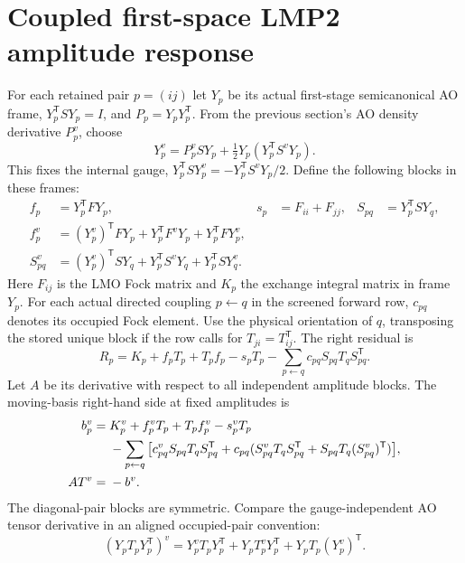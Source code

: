 \documentclass[11pt]{article}
\begin{document}
\section{Coupled first-space LMP2 amplitude response}
For each retained pair $p=(ij)$ let $Y_p$ be its actual first-stage
semicanonical AO frame, $Y_p^{\mathsf T} S Y_p=I$, and $P_p=Y_pY_p^{\mathsf T}$.
From the previous section's AO density derivative $P_p^v$, choose
\begin{equation}
 Y_p^v=P_p^v S Y_p+\tfrac12Y_p(Y_p^{\mathsf T}S^vY_p).
\end{equation}
This fixes the internal gauge, $Y_p^{\mathsf T}S Y_p^v
=-Y_p^{\mathsf T}S^vY_p/2$. Define the following blocks in these frames:
\begin{align}
 f_p&=Y_p^{\mathsf T}F Y_p,& s_p&=F_{ii}+F_{jj},&
 S_{pq}&=Y_p^{\mathsf T}S Y_q,\\
 f_p^v&=(Y_p^v)^{\mathsf T}FY_p+Y_p^{\mathsf T}F^vY_p+Y_p^{\mathsf T}FY_p^v,\\
 S_{pq}^v&=(Y_p^v)^{\mathsf T}S Y_q+Y_p^{\mathsf T}S^v Y_q+Y_p^{\mathsf T}S Y_q^v .
\end{align}
Here $F_{ij}$ is the LMO Fock matrix and $K_p$ the exchange integral
matrix in frame $Y_p$. For each actual directed coupling $p\gets q$ in
the screened forward row, $c_{pq}$ denotes its occupied Fock element.
Use the physical orientation of $q$, transposing the stored unique block
if the row calls for $T_{ji}=T_{ij}^{\mathsf T}$. The right residual is
\begin{equation}
 R_p=K_p+f_pT_p+T_pf_p-s_pT_p-
        \sum_{p\gets q}c_{pq}S_{pq}T_qS_{pq}^{\mathsf T}.
\end{equation}
Let $A$ be its derivative with respect to all independent amplitude blocks.
The moving-basis right-hand side at fixed amplitudes is
\begin{align}
 b_p^v={}&K_p^v+f_p^vT_p+T_pf_p^v-s_p^vT_p \notag\\
 &-\sum_{p\gets q}\big[
 c_{pq}^v S_{pq}T_q S_{pq}^{\mathsf T}
 +c_{pq}(S_{pq}^vT_q S_{pq}^{\mathsf T}
 +S_{pq}T_q(S_{pq}^v)^{\mathsf T})\big],\\
 A T^v={}&-b^v .
\end{align}
The diagonal-pair blocks are symmetric. Compare the gauge-independent AO
tensor derivative in an aligned occupied-pair convention:
\begin{equation}
 (Y_pT_pY_p^{\mathsf T})^v=Y_p^v T_p Y_p^{\mathsf T}
 +Y_p T_p^v Y_p^{\mathsf T}+Y_p T_p(Y_p^v)^{\mathsf T}.
\end{equation}
\end{document}
